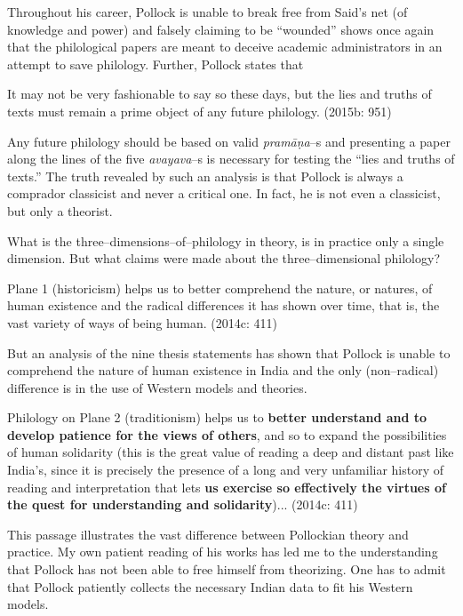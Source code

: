 Throughout his career, Pollock is unable to break free from Said’s net (of knowledge and power) and falsely claiming to be “wounded” shows once again that the philological papers are meant to deceive academic administrators in an attempt to save philology. Further, Pollock states that

\begin{myquote}
It may not be very fashionable to say so these days, but the lies and truths of texts must remain a prime object of any future philology. (2015b: 951)
\end{myquote}

Any future philology should be based on valid\textit{ pramāṇa}–s and presenting a paper along the lines of the five \textit{avayava}–s is necessary for testing the “lies and truths of texts.” The truth revealed by such an analysis is that Pollock is always a comprador classicist and never a critical one. In fact, he is not even a classicist, but only a theorist.

What is the three–dimensions–of–philology in theory, is in practice only a single dimension. But what claims were made about the three–dimensional philology?

\begin{myquote}
Plane 1 (historicism) helps us to better comprehend the nature, or natures, of human existence and the radical differences it has shown over time, that is, the vast variety of ways of being human. (2014c: 411)
\end{myquote}

But an analysis of the nine thesis statements has shown that Pollock is unable to comprehend the nature of human existence in India and the only (non–radical) difference is in the use of Western models and theories.

\begin{myquote}
Philology on Plane 2 (traditionism) helps us to \textbf{better understand and to develop patience for the views of others}, and so to expand the possibilities of human solidarity (this is the great value of reading a deep and distant past like India’s, since it is precisely the presence of a long and very unfamiliar history of reading and interpretation that lets \textbf{us exercise so effectively the virtues of the quest for understanding and solidarity})... (2014c: 411)
\end{myquote}

This passage illustrates the vast difference between Pollockian theory and practice. My own patient reading of his works has led me to the understanding that Pollock has not been able to free himself from theorizing. One has to admit that Pollock patiently collects the necessary Indian data to fit his Western models.


